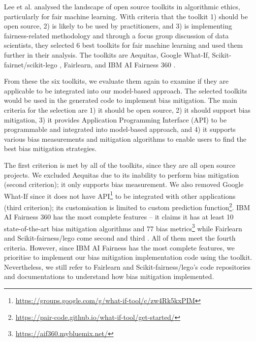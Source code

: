 \documentclass[final,5p,times,twocolumn]{elsarticle}
\begin{document}
Lee et al. \cite{lee2021landscape} analysed the landscape of open source toolkits in algorithmic ethics, particularly for fair machine learning. With criteria that the toolkit 1) should be open source, 2) is likely to be used by practitioners, and 3) is implementing fairness-related methodology and through a focus group discussion of data scientists, they selected 6 best toolkits for fair machine learning and used them further in their analysis. The toolkits are Aequitas\cite{saleiro2019aequitas}, Google What-If\cite{googlewhatif2020}, Scikit-fairnet/scikit-lego \cite{scikitfairness2022,scikitlego2022}, Fairlearn\cite{bird2020fairlearn}, and IBM AI Fairness 360 \cite{bellamy2018ai}.  

From these the six toolkits, we evaluate them again to examine if they are applicable to be integrated into our model-based approach. The selected toolkits would be used in the generated code to implement bias mitigation. The main criteria for the selection are 1) it should be open source, 2) it should support bias mitigation, 3) it provides Application Programming Interface (API) to be programmable and integrated into model-based approach, and 4) it supports various bias measurements and mitigation algorithms to enable users to find the best bias mitigation strategies. 

The first criterion is met by all of the toolkits, since they are all open source projects. We excluded Aequitas due to its inability to perform bias mitigation (second criterion); it only supports bias measurement. We also removed Google What-If since it does not have API\footnote{\url{https://groups.google.com/g/what-if-tool/c/zw4Rk5kxPIM}} to be integrated with other applications (third criterion); its customisation is limited to custom prediction function\footnote{\url{https://pair-code.github.io/what-if-tool/get-started/}}. IBM AI Fairness 360 has the most complete features -- it claims it has at least 10 state-of-the-art bias mitigation algorithms and 77 bias metrics\footnote{\url{https://aif360.mybluemix.net/}} while Fairlearn and Scikit-fairness/lego come second and third \cite{lee2021landscape}. All of them meet the fourth criteria. However, since IBM AI Fairness has the most complete features, we prioritise to implement our bias mitigation implementation code using the toolkit. Nevertheless, we still refer to Fairlearn and Scikit-fairness/lego's code repositories and documentations to understand how bias mitigation implemented. 

\end{document}
